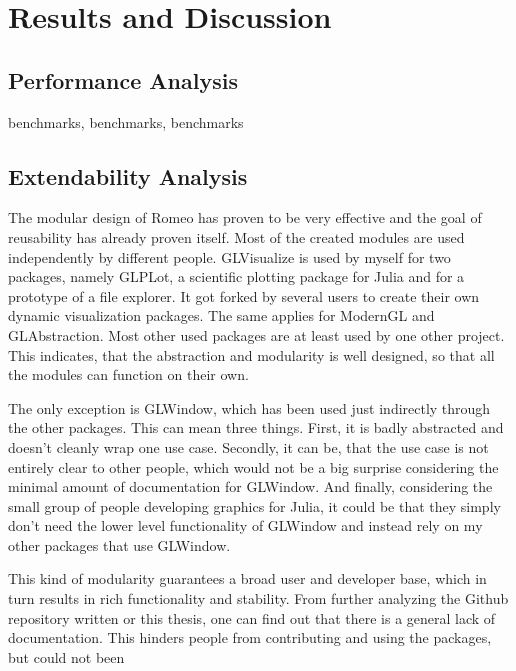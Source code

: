 \section{Results and Discussion}

\subsection{Performance Analysis}
benchmarks, benchmarks, benchmarks

\subsection{Extendability Analysis}

The modular design of Romeo has proven to be very effective and the goal of reusability has already proven itself.
Most of the created modules are used independently by different people.
GLVisualize is used by myself for two packages, namely GLPLot, a scientific plotting package for Julia and for a prototype of a file explorer. 
It got forked by several users to create their own dynamic visualization packages.
The same applies for ModernGL and GLAbstraction. Most other used packages are at least used by one other project.
This indicates, that the abstraction and modularity is well designed, so that all the modules can function on their own.

The only exception is GLWindow, which has been used just indirectly through the other packages. 
This can mean three things.
First, it is badly abstracted and doesn't cleanly wrap one use case.
Secondly, it can be, that the use case is not entirely clear to other people, which would not be a big surprise considering the minimal amount of documentation for GLWindow.
And finally, considering the small group of people developing graphics for Julia, it could be that they simply don't need the lower level functionality of GLWindow and instead rely on my other packages that use GLWindow.

This kind of modularity guarantees a broad user and developer base, which in turn results in rich functionality and stability.
From further analyzing the Github repository written or this thesis, one can find out that there is a general lack of documentation.
This hinders people from contributing and using the packages, but could not been 

